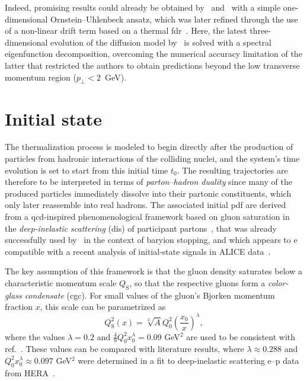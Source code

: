 \documentclass[a4paper,12pt]{book}
\begin{document}
Indeed, promising results could already be obtained by~\textcite{Wolschin1999,Wolschin2007} and~\textcite{Biyajima2002} with a simple one-dimensional Ornstein–Uhlenbeck ansatz, which was later refined through the use of a non-linear drift term based on a thermal \acrshort{fdr}~\parencite{Wolschin2019}. Here, the latest three-dimensional evolution of the diffusion model by~\textcite{Hoelck2023} is solved with a spectral eigenfunction decomposition, overcoming the numerical accuracy limitation of the latter that restricted the authors to obtain predictions beyond the low transverse momentum region ($p_\perp < 2$~GeV). 

\section{Initial state}

The thermalization process is modeled to begin directly after the production of particles from hadronic interactions of the colliding nuclei, and 
the system’s time evolution is set to start from this initial time $t_0$. The resulting trajectories are therefore to be interpreted in terms of \textit{parton–hadron duality} since many of the produced particles immediately dissolve into their partonic constituents, which only later reassemble into real hadrons. The associated initial \acrshort{pdf} are derived from a \acrshort{qcd}-inspired phenomenological framework based
on gluon saturation in the \textit{deep-inelastic scattering} (\acrshort{dis}) of participant partons~\parencite{GRIBOV1983,MUELLER1986,BLAIZOT1987,McLerran1994}, that was already successfully used by~\textcite{Hoelck2020} in the context of baryion stopping, and which appears to e compatible with a recent analysis of initial-state signals in ALICE data~\parencite{Acharya2022}. 

The key assumption of this framework is that the gluon density saturates below a characteristic momentum scale $Q_\text{S}$, so that the respective gluons form a \textit{color-glass condensate} (\acrshort{cgc}). For small values of the gluon’s Bjorken momentum fraction $x$, this scale can be parametrized as~\parencite{Golec1998}
\begin{equation}
    Q_\text{S}^2(x) = \sqrt[3]{A}Q_0^2 \left( \frac{x_0}{x}   \right)^\lambda,
\end{equation}
where the values $\lambda = 0.2$ and $\frac{4}{9}Q_0^2 x_0^\lambda = 0.09$ GeV$^2$ are used to be consistent with ref.~\parencite{Hoelck2020,Hoelck2023}. These values can be compared with literature results, where $\lambda \approx 0.288$ and $Q_0^2x_0^\lambda \approx 0.097$ GeV$^2$ were determined in a fit to deep-inelastic scattering e–p data from HERA~\parencite{Golec1998}.
\end{document}
